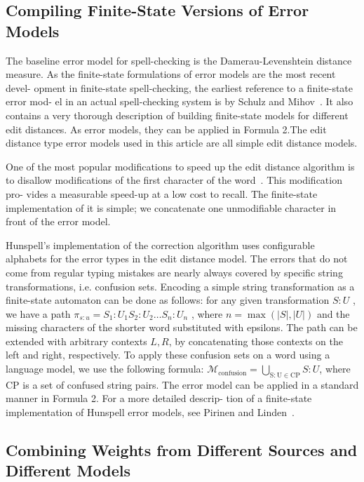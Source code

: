 \documentclass[postprint]{flammie}
\begin{document}
\subsection{Compiling Finite-State Versions of Error Models}

The baseline error model for spell-checking is the Damerau-Levenshtein distance
measure. As the finite-state formulations of error models are the most recent
devel- opment in finite-state spell-checking, the earliest reference to a
finite-state error mod- el in an actual spell-checking system is by Schulz and
Mihov~\cite{schulz2002fast}. It also contains a very thorough description of
building finite-state models for different edit distances.  As error models,
they can be applied in Formula 2.The edit distance type error models used in
this article are all simple edit distance models.

One of the most popular modifications to speed up the edit distance algorithm
is to disallow modifications of the first character of the
word~\cite{bhagat2007spelling}. This modification pro- vides a measurable
speed-up at a low cost to recall. The finite-state implementation of it is
simple; we concatenate one unmodifiable character in front of the error model.

Hunspell’s implementation of the correction algorithm uses configurable
alphabets for the error types in the edit distance model. The errors that do
not come from regular typing mistakes are nearly always covered by specific
string transformations, i.e.  confusion sets. Encoding a simple string
transformation as a finite-state automaton can be done as follows: for any
given transformation $S:U$ , we have a path $\pi_{s:u} = S_1:U_1 S_2:U_2 \ldots S_n:U_n$ , where $n= \max(|S|, |U|)$ and
the missing characters of the shorter word substituted with epsilons. The path
can be extended with arbitrary contexts $L, R$, by concatenating those contexts
on the left and right, respectively. To apply these confusion sets on a word
using a language model, we use the following formula: $\mathcal{M}_\mathrm{confusion} = \bigcup_{\mathrm{S:U} \in \mathrm{CP}} S:U$, where $\mathrm{CP}$ is a set
of confused string pairs. The error model can be applied in a standard manner
in Formula 2. For a more detailed descrip- tion of a finite-state
implementation of Hunspell error models, see Pirinen and
Linden~\cite{pirinen2010creating}.

\subsection{Combining Weights from Different Sources and Different Models}
\end{document}
